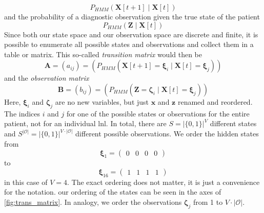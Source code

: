 \documentclass[../ms.tex]{subfiles}
\begin{document}
\begin{equation}
    P_{HMM}\left( \mathbf{X}[t+1] \mid \mathbf{X}[t] \right)
\end{equation}
%
and the probability of a diagnostic observation given the true state of the patient
%
\begin{equation}
    P_{HMM}\left( \mathbf{Z} \mid \mathbf{X}[t] \right)
\end{equation}
%
Since both our state space and our observation space are discrete and finite, it is possible to enumerate all possible states and observations and collect them in a table or matrix. This so-called \emph{transition matrix} would then be
%
\begin{equation}
    \mathbf{A} = \left( a_{ij} \right) = \left( P_{HMM} \left( \mathbf{X}[t+1] = \boldsymbol{\xi}_i \mid \mathbf{X}[t] = \boldsymbol{\xi}_j \right) \right)
\end{equation}
%
and the \emph{observation matrix}
%
\begin{equation}
    \mathbf{B} = \left( b_{ij} \right) = \left( P_{HMM} \left( \mathbf{Z} = \boldsymbol{\zeta}_i \mid \mathbf{X}[t] = \boldsymbol{\xi}_j \right) \right)
\end{equation}
%
Here, $\boldsymbol{\xi}_i$ and $\boldsymbol{\zeta}_j$ are no new variables, but just $\mathbf{x}$ and $\mathbf{z}$ renamed and reordered. The indices $i$ and $j$ for one of the possible states or observations for the entire patient, not for an individual \gls{lnl}. In total, there are $S = |\{ 0,1 \}|^V$ different states and $S^{|\mathcal{O}|} = |\{ 0,1 \}|^{V \cdot |\mathcal{O}|}$ different possible observations. We order the hidden states from
%
\begin{equation}
    \boldsymbol{\xi}_1 = 
    \begin{pmatrix}
        0 & 0 & 0 & 0
    \end{pmatrix}
\end{equation}
%
to
%
\begin{equation} \label{eq:obs_matrix}
    \boldsymbol{\xi}_{16} = 
    \begin{pmatrix}
        1 & 1 & 1 & 1
    \end{pmatrix}
\end{equation}
%
in this case of $V = 4$. The exact ordering does not matter, it is just a convenience for the notation. our ordering of the states can be seen in the axes of \cref{fig:trans_matrix}. In analogy, we order the observations $\boldsymbol{\zeta}_j$ from 1 to $V \cdot |\mathcal{O}|$.
\end{document}
